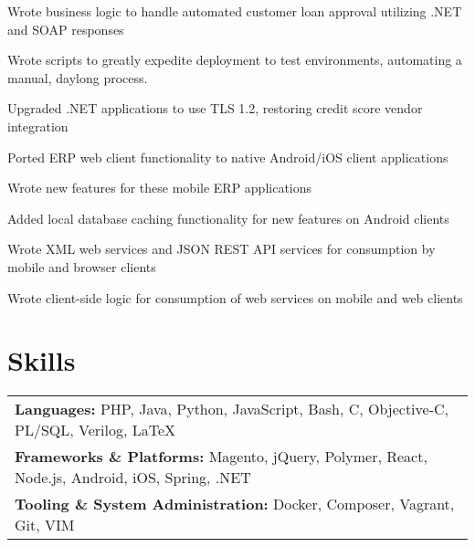 \documentclass[line]{resume}
\begin{document}
\begin{myitemize}
	\item Wrote business logic to handle automated customer loan approval utilizing .NET and SOAP responses
	\item Wrote scripts to greatly expedite deployment to test environments, automating a manual, daylong process.
	\item Upgraded .NET applications to use TLS 1.2, restoring credit score vendor integration
\end{myitemize}

\begin{myitemize}
	\item Ported ERP web client functionality to native Android/iOS client applications
	\item Wrote new features for these mobile ERP applications
	\item Added local database caching functionality for new features on Android clients
	\item Wrote XML web services and JSON REST API services for consumption by mobile and browser clients
	\item Wrote client-side logic for consumption of web services on mobile and web clients
\end{myitemize}

\section{Skills}
\begin{tabularx}{\linewidth}{X}
	\textbf{Languages:} PHP, Java, Python, JavaScript, Bash, C, Objective-C, PL/SQL, Verilog, \LaTeX \\
	\textbf{Frameworks \& Platforms:} Magento, jQuery, Polymer, React, Node.js, Android, iOS, Spring, .NET \\
	\textbf{Tooling \& System Administration:} Docker, Composer, Vagrant, Git, VIM \\
\end{tabularx}
\end{document}
